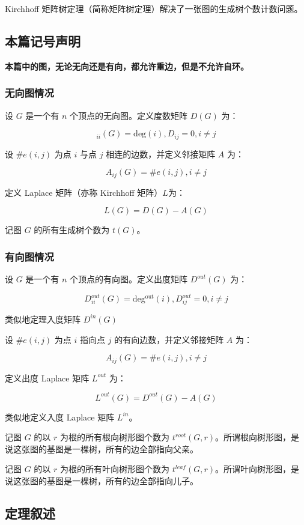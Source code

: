 
Kirchhoff 矩阵树定理（简称矩阵树定理）解决了一张图的生成树个数计数问题。

\subsection{本篇记号声明}

\textbf{本篇中的图，无论无向还是有向，都允许重边，但是不允许自环。}

\subsubsection{无向图情况}

设 $G$ 是一个有 $n$ 个顶点的无向图。定义度数矩阵 $D(G)$ 为：

$$
_{ii}(G) = \mathrm{deg}(i), D_{ij} = 0, i\neq j
$$

设 $\#e(i,j)$ 为点 $i$ 与点 $j$ 相连的边数，并定义邻接矩阵 $A$ 为：

$$
A_{ij}(G)=\#e(i,j), i\neq j
$$

定义 Laplace 矩阵（亦称 Kirchhoff 矩阵）$L$为：

$$
L(G) = D(G) - A(G)
$$

记图 $G$ 的所有生成树个数为 $t(G)$。

\subsubsection{有向图情况}

设 $G$ 是一个有 $n$ 个顶点的有向图。定义出度矩阵 $D^{out}(G)$ 为：

$$
D^{out}_{ii}(G) = \mathrm{deg^{out}}(i), D^{out}_{ij} = 0, i\neq j
$$

类似地定理入度矩阵 $D^{in}(G)$

设 $\#e(i,j)$ 为点 $i$ 指向点 $j$ 的有向边数，并定义邻接矩阵 $A$ 为：

$$
A_{ij}(G)=\#e(i,j), i\neq j
$$

定义出度 Laplace 矩阵 $L^{out}$ 为：

$$
L^{out}(G) = D^{out}(G) - A(G)
$$

类似地定义入度 Laplace 矩阵 $L^{in}$。

记图 $G$ 的以 $r$ 为根的所有根向树形图个数为 $t^{root}(G,r)$。所谓根向树形图，是说这张图的基图是一棵树，所有的边全部指向父亲。

记图 $G$ 的以 $r$ 为根的所有叶向树形图个数为 $t^{leaf}(G,r)$。所谓叶向树形图，是说这张图的基图是一棵树，所有的边全部指向儿子。

\subsection{定理叙述}

